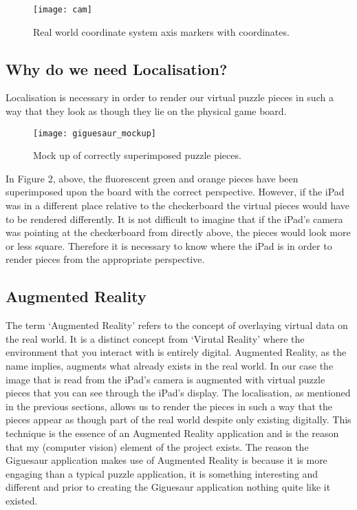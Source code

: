 \documentclass{article}
\begin{document}
\begin{figure}[ht]
\begin{center}
\texttt{[image: cam]} 
\caption{Real world coordinate system axis markers with coordinates.}
\end{center}
\end{figure}

\subsection {Why do we need Localisation?}

Localisation is necessary in order to render our virtual puzzle pieces in such a way that they look as though they lie on the physical game board. 
\vspace*{2\baselineskip}

\begin{figure}[H]
\begin{center}
\texttt{[image: giguesaur\_mockup]} 
\caption{Mock up of correctly superimposed puzzle pieces.}
\end{center}
\end{figure}

In Figure 2, above, the fluorescent green and orange pieces have been superimposed upon the board with the correct perspective. However, if the iPad was in a different place relative to the checkerboard the virtual pieces would have to be rendered differently. It is not difficult to imagine that if the iPad's camera was pointing at the checkerboard from directly above, the pieces would look more or less square. Therefore it is necessary to know where the iPad is in order to render pieces from the appropriate perspective.

\subsection{Augmented Reality}
The term `Augmented Reality' refers to the concept of overlaying virtual data on the real world. It is a distinct concept from `Virutal Reality' where the environment that you interact with is entirely digital. Augmented Reality, as the name implies, augments what already exists in the real world. In our case the image that is read from the iPad's camera is augmented with virtual puzzle pieces that you can see through the iPad's display. The localisation, as mentioned in the previous sections, allows us to render the pieces in such a way that the pieces appear as though part of the real world despite only existing digitally. This technique is the essence of an Augmented Reality application and is the reason that my (computer vision) element of the project exists. The reason the Giguesaur application makes use of Augmented Reality is because it is more engaging than a typical puzzle application, it is something interesting and different and prior to creating the Giguesaur application nothing quite like it existed. 
\end{document}
